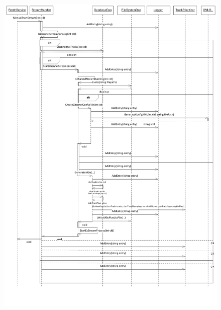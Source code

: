 \documentclass[a4paper,11pt,report]{article}
\begin{document}
\begin{figure}[htp]
\centering
\includegraphics[width=17cm,keepaspectratio=true,trim=0pt 300pt 0pt 0pt]{./StartStreamSD.pdf}
\end{figure}
\end{document}
